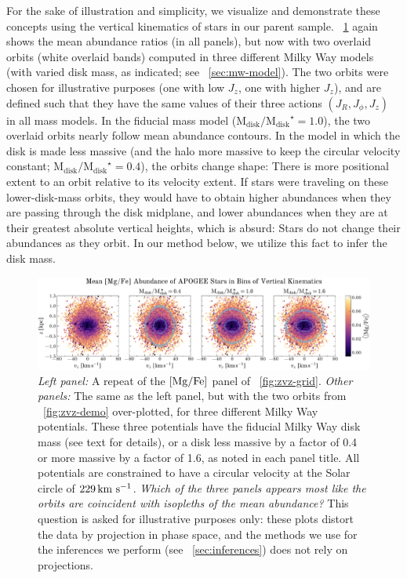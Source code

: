 \documentclass[modern]{aastex63}
\newcommand{\mdisk}{\ensuremath{\mathrm{M}_\mathrm{disk}}}
\newcommand{\mratio}{\ensuremath{\mdisk / \mdisk^\star}}
\begin{document}
For the sake of illustration and simplicity, we visualize and demonstrate these
concepts using the vertical kinematics of stars in our parent sample.
\figurename~\ref{fig:zvz-mgfe} again shows the mean  abundance
ratios (in all panels), but now with two overlaid orbits (white overlaid bands)
computed in three different Milky Way models (with varied disk mass, as
indicated; see \sectionname~\ref{sec:mw-model}).
The two orbits were chosen for illustrative purposes (one with low $J_z$, one
with higher $J_z$), and are defined such that they have the same values of their
three actions $(J_R, J_\phi, J_z)$ in all mass models.
In the fiducial mass model ($\mratio = 1.0$), the two overlaid orbits nearly
follow mean abundance contours.
In the model in which the disk is made less massive (and the halo more massive
to keep the circular velocity constant; $\mratio = 0.4$), the orbits change
shape:
There is more positional extent to an orbit relative to its velocity extent.
If stars were traveling on these lower-disk-mass orbits, they would have to
obtain higher abundances when they are passing through the disk midplane,
and lower abundances when they are at their greatest absolute vertical heights,
which is absurd: Stars do not change their abundances as they orbit.
In our method below, we utilize this fact to infer the disk mass.


\begin{figure}[!tp]
  \begin{mdframed}
  \begin{center}
  \includegraphics[width=\textwidth]{zvz-mean-MG_FE}
  \end{center}
  \caption{%
    \textsl{Left panel:} A repeat of the ${[\mathrm{Mg}/\mathrm{Fe}]}$ panel of
    \figurename~\ref{fig:zvz-grid}.
    \textsl{Other panels:} The same as the left panel, but with the two orbits
    from \figurename~\ref{fig:zvz-demo} over-plotted, for three different Milky
    Way potentials.
    These three potentials have the fiducial Milky Way disk mass (see text
    for details), or a disk less massive by a factor of 0.4 or more
    massive by a factor of 1.6, as noted in each panel title.
    All potentials are constrained to have a circular velocity at the
    Solar circle of $229\,\mathrm{km}~\mathrm{s}^{-1}$.
    \emph{Which of the three panels appears most like the orbits are
    coincident with isopleths of the mean abundance?}
    This question is asked for illustrative purposes only: these plots distort
    the data by projection in phase space, and the methods we use for the
    inferences we perform (see \sectionname~\ref{sec:inferences}) does not rely
    on projections.
  \label{fig:zvz-mgfe}
  }
  \end{mdframed}
\end{figure}
\end{document}
